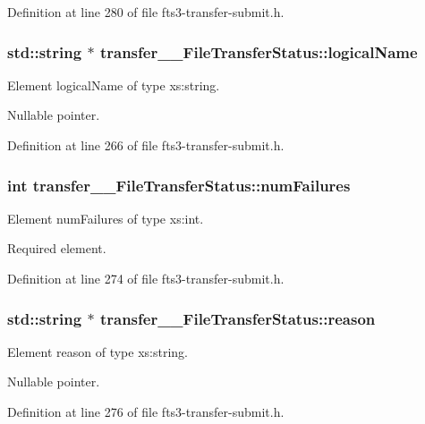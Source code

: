 Definition at line 280 of file fts3-\/transfer-\/submit.h.

\subsubsection[{logicalName}]{\setlength{\rightskip}{0pt plus 5cm}std::string $\ast$ {\bf transfer\_\-\_\-FileTransferStatus::logicalName}}\label{classtransfer____FileTransferStatus_ae28af9f2eadc5038ab3b4858bcd74a46}


Element logicalName of type xs:string. 

Nullable pointer. 

Definition at line 266 of file fts3-\/transfer-\/submit.h.

\subsubsection[{numFailures}]{\setlength{\rightskip}{0pt plus 5cm}int {\bf transfer\_\-\_\-FileTransferStatus::numFailures}}\label{classtransfer____FileTransferStatus_a5ff74ed73072e23d7ccb64c6adfbd7be}


Element numFailures of type xs:int. 

Required element. 

Definition at line 274 of file fts3-\/transfer-\/submit.h.

\subsubsection[{reason}]{\setlength{\rightskip}{0pt plus 5cm}std::string $\ast$ {\bf transfer\_\-\_\-FileTransferStatus::reason}}\label{classtransfer____FileTransferStatus_a6731977e9f161be9dd2b0d5643d62b3c}


Element reason of type xs:string. 

Nullable pointer. 

Definition at line 276 of file fts3-\/transfer-\/submit.h.

